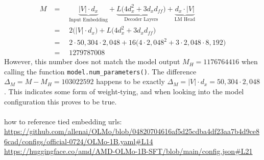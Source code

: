 \begin{align*}
    M &=\quad \underbrace{|V| \cdot d_x}_{\text{Input Embedding}} 
    + \underbrace{L \big( 4 d_x^2 + 3 d_x d_{ff} \big)}_{\text{Decoder Layers}}
    + \underbrace{d_x \cdot |V|}_{\text{LM Head}} \\
    &=\quad 2 \bigl( |V| \cdot d_x \bigr)
    + L \big( 4 d_x^2 + 3 d_x d_{ff} \big) \\
    &=\quad 2 \cdot 50{,}304 \cdot 2{,}048 + 16 \bigl(4 \cdot 2{,}048^2 + 3 \cdot 2{,}048 \cdot 8{,}192 \bigr) \\
    &=\quad 1279787008
\end{align*}
However, this number does not match the model output $M_H = 1176764416$ when calling the function \texttt{model.num\_parameters()}. The difference $\Delta_M =  M - M_H = 103022592$ happens to be exactly $\Delta_M = |V| \cdot d_x = 50{,}304 \cdot 2{,}048$. This indicates some form of weight-tying, and when looking into the model configuration this proves to be true.
\\\\
how to reference tied embedding urls:
\url{https://github.com/allenai/OLMo/blob/04820704616af5d25cdba4df23aa7b4d9ce86cad/configs/official-0724/OLMo-1B.yaml#L14} \\
\url{https://huggingface.co/amd/AMD-OLMo-1B-SFT/blob/main/config.json#L21}

